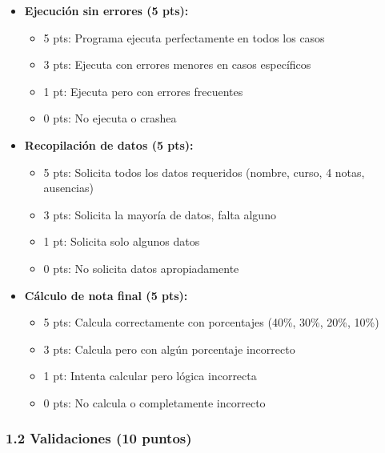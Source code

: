 \documentclass[12pt,a4paper]{article}
\begin{document}
\begin{itemize}[leftmargin=*]
    \item \textbf{Ejecución sin errores (5 pts):}
    \begin{itemize}
        \item 5 pts: Programa ejecuta perfectamente en todos los casos
        \item 3 pts: Ejecuta con errores menores en casos específicos
        \item 1 pt: Ejecuta pero con errores frecuentes
        \item 0 pts: No ejecuta o crashea
    \end{itemize}
    
    \item \textbf{Recopilación de datos (5 pts):}
    \begin{itemize}
        \item 5 pts: Solicita todos los datos requeridos (nombre, curso, 4 notas, ausencias)
        \item 3 pts: Solicita la mayoría de datos, falta alguno
        \item 1 pt: Solicita solo algunos datos
        \item 0 pts: No solicita datos apropiadamente
    \end{itemize}
    
    \item \textbf{Cálculo de nota final (5 pts):}
    \begin{itemize}
        \item 5 pts: Calcula correctamente con porcentajes (40\%, 30\%, 20\%, 10\%)
        \item 3 pts: Calcula pero con algún porcentaje incorrecto
        \item 1 pt: Intenta calcular pero lógica incorrecta
        \item 0 pts: No calcula o completamente incorrecto
    \end{itemize}
\end{itemize}

\subsubsection{1.2 Validaciones (10 puntos)}
\end{document}
